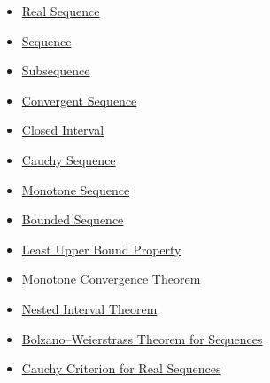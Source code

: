 \begin{dependencies}
\begin{itemize}
  \item \hyperref[def:real-sequence]{Real Sequence}
  \item \hyperref[def:sequence]{Sequence}
  \item \hyperref[def:subsequence-of-sequence]{Subsequence}
  \item \hyperref[def:convergent-sequence]{Convergent Sequence}
  \item \hyperref[def:closed-interval]{Closed Interval}
  \item \hyperref[def:cauchy-sequence]{Cauchy Sequence}
  \item \hyperref[def:monotone-sequence]{Monotone Sequence}
  \item \hyperref[def:bounded-sequence]{Bounded Sequence}
  \item \hyperref[def:least-upper-bound-property]{Least Upper Bound Property}
  \item \hyperref[thm:monotone-convergence-theorem]{Monotone Convergence Theorem}
  \item \hyperref[thm:nested-interval-theorem]{Nested Interval Theorem}
  \item \hyperref[thm:bolzano-weierstrass-sequences]{Bolzano--Weierstrass Theorem for Sequences}
  \item \hyperref[thm:cauchy-criterion-real-sequences]{Cauchy Criterion for Real Sequences}
\end{itemize}
\end{dependencies}
